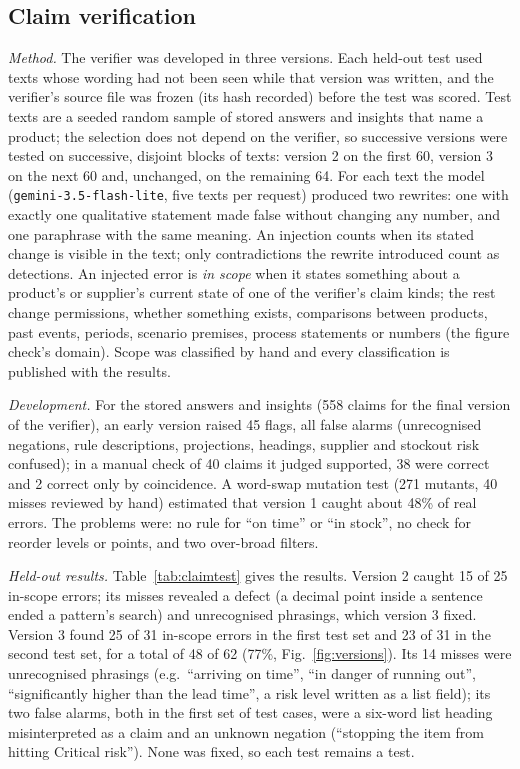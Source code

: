 \documentclass[conference]{IEEEtran}
\begin{document}
\subsection{Claim verification}

\textit{Method.} The verifier was developed in three versions. Each held-out test used texts whose wording
had not been seen while that version was written, and the verifier's source file was frozen (its hash
recorded) before the test was scored. Test texts are a seeded random sample of stored answers and insights
that name a product; the selection does not depend on the verifier, so successive versions were tested on
successive, disjoint blocks of texts: version 2 on the first 60, version 3 on the next 60 and, unchanged, on
the remaining 64. For each text the model (\texttt{gemini-3.5-flash-lite}, five texts
per request) produced two rewrites: one with exactly one qualitative statement made false without changing
any number, and one paraphrase with the same meaning. An injection counts when its stated change is visible
in the text; only contradictions the rewrite introduced count as detections. An injected error is
\textit{in scope} when it states something about a product's or supplier's current state of one of the
verifier's claim kinds; the rest change permissions, whether something exists, comparisons between products,
past events, periods, scenario premises, process statements or numbers (the figure check's domain). Scope
was classified by hand and every classification is published with the results.

\textit{Development.} For the stored answers and insights (558 claims for the final version of the
verifier), an early version raised 45 flags, all false alarms (unrecognised negations, rule descriptions,
projections, headings, supplier and stockout risk confused); in a manual check of 40 claims it judged
supported, 38 were correct and 2 correct only by coincidence. A word-swap mutation test (271 mutants, 40
misses reviewed by hand) estimated that version 1 caught about 48\% of real errors. The problems were: no
rule for ``on time'' or ``in stock'', no check for reorder levels or points, and two over-broad filters.

\textit{Held-out results.} Table~\ref{tab:claimtest} gives the results. Version 2 caught 15 of 25 in-scope
errors; its misses revealed a defect (a decimal point inside a sentence ended a pattern's search) and
unrecognised phrasings, which version 3 fixed. Version 3 found 25 of 31 in-scope errors in the first test set
and 23 of 31 in the second test set, for a total of 48 of 62 (77\%, Fig.~\ref{fig:versions}). Its 14 misses were unrecognised
phrasings (e.g.\ ``arriving on time'', ``in danger of running out'', ``significantly higher than the lead
time'', a risk level written as a list field); its two false alarms, both in the first set of test cases, were a six-word list
heading misinterpreted as a claim and an unknown negation (``stopping the item from hitting Critical risk''). None was fixed, so each
test remains a test.
\end{document}
